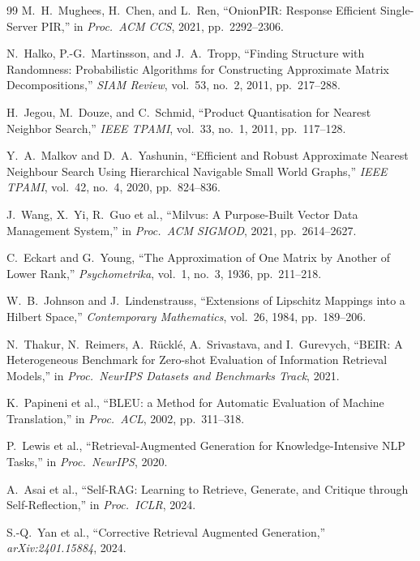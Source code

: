 \documentclass[11pt,a4paper]{article}
\begin{document}
\begin{thebibliography}{99}
 M.\ H.\ Mughees, H.\ Chen, and L.\ Ren,
``OnionPIR: Response Efficient Single-Server PIR,'' in
\emph{Proc.\ ACM CCS}, 2021, pp.\ 2292--2306.

 N.\ Halko, P.-G.\ Martinsson, and J.\ A.\ Tropp,
``Finding Structure with Randomness: Probabilistic Algorithms for
Constructing Approximate Matrix Decompositions,'' \emph{SIAM Review},
vol.\ 53, no.\ 2, 2011, pp.\ 217--288.

 H.\ Jegou, M.\ Douze, and C.\ Schmid, ``Product
Quantisation for Nearest Neighbor Search,'' \emph{IEEE TPAMI},
vol.\ 33, no.\ 1, 2011, pp.\ 117--128.

 Y.\ A.\ Malkov and D.\ A.\ Yashunin, ``Efficient and
Robust Approximate Nearest Neighbour Search Using Hierarchical
Navigable Small World Graphs,'' \emph{IEEE TPAMI}, vol.\ 42,
no.\ 4, 2020, pp.\ 824--836.

 J.\ Wang, X.\ Yi, R.\ Guo et al., ``Milvus:
A Purpose-Built Vector Data Management System,'' in
\emph{Proc.\ ACM SIGMOD}, 2021, pp.\ 2614--2627.

 C.\ Eckart and G.\ Young, ``The Approximation of
One Matrix by Another of Lower Rank,'' \emph{Psychometrika}, vol.\ 1,
no.\ 3, 1936, pp.\ 211--218.

 W.\ B.\ Johnson and J.\ Lindenstrauss, ``Extensions
of Lipschitz Mappings into a Hilbert Space,'' \emph{Contemporary
Mathematics}, vol.\ 26, 1984, pp.\ 189--206.

 N.\ Thakur, N.\ Reimers, A.\ R\"uckl\'e, A.\ Srivastava,
and I.\ Gurevych, ``BEIR: A Heterogeneous Benchmark for Zero-shot
Evaluation of Information Retrieval Models,'' in \emph{Proc.\ NeurIPS
Datasets and Benchmarks Track}, 2021.

 K.\ Papineni et al., ``BLEU: a Method for Automatic
Evaluation of Machine Translation,'' in \emph{Proc.\ ACL}, 2002,
pp.\ 311--318.

 P.\ Lewis et al., ``Retrieval-Augmented Generation
for Knowledge-Intensive NLP Tasks,'' in \emph{Proc.\ NeurIPS}, 2020.

 A.\ Asai et al., ``Self-RAG: Learning to
Retrieve, Generate, and Critique through Self-Reflection,'' in
\emph{Proc.\ ICLR}, 2024.

 S.-Q.\ Yan et al., ``Corrective Retrieval Augmented
Generation,'' \emph{arXiv:2401.15884}, 2024.


\end{thebibliography}
\end{document}
